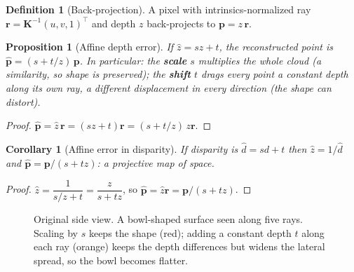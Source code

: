\documentclass[11pt,a4paper]{article}
\theoremstyle{plain}
\newtheorem{proposition}[theorem]{Proposition}
\newtheorem{corollary}[theorem]{Corollary}
\theoremstyle{definition}
\newtheorem{definition}[theorem]{Definition}
\numberwithin{equation}{section}
\begin{document}
\begin{definition}[Back-projection]
A pixel with intrinsics-normalized ray $\bm r=\bm K^{-1}(u,v,1)^\top$ and depth $z$ back-projects to $\bm p=z\,\bm r$.
\end{definition}

\begin{proposition}[Affine depth error]\label{prop:affine}
If $\hat z=sz+t$, the reconstructed point is $\hat{\bm p}=(s+t/z)\,\bm p$. In particular: the \textbf{scale} $s$ multiplies the whole cloud (a similarity, so shape is preserved); the \textbf{shift} $t$ drags every point a constant depth along its own ray, a different displacement in every direction (the shape can distort).
\end{proposition}
\begin{proof}
$\hat{\bm p}=\hat z\,\bm r=(sz+t)\bm r=(s+t/z)\,z\bm r$.
\end{proof}

\begin{corollary}[Affine error in disparity]
If disparity is $\hat d=sd+t$ then $\hat z=1/\hat d$ and $\hat{\bm p}=\bm p/(s+tz)$: a \emph{projective} map of space.
\end{corollary}
\begin{proof}
$\hat z=\dfrac{1}{s/z+t}=\dfrac{z}{s+tz}$, so $\hat{\bm p}=\hat z\bm r=\bm p/(s+tz)$.
\end{proof}

\begin{figure}[H]
\centering
{}
\caption{Original side view. A bowl-shaped surface seen along five rays. Scaling by $s$ keeps the shape (red); adding a constant depth $t$ along each ray (orange) keeps the depth differences but widens the lateral spread, so the bowl becomes flatter.}
\end{figure}
\end{document}
